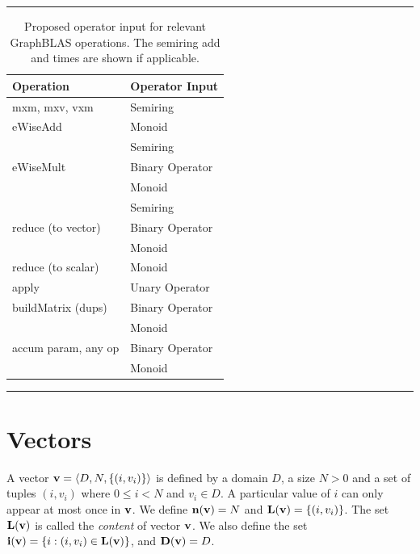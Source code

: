 \begin{table}
    \hrule
    \begin{center}
        \caption{Proposed operator input for relevant GraphBLAS operations. 
        The semiring add and times are shown if applicable.}
        \label{Tab:OperatorInputType}
        \begin{tabular}{l|l}
        Operation           & Operator Input  \\ \hline
        {\sf mxm, mxv, vxm} & Semiring \\ \hline
        {\sf eWiseAdd}    & Monoid           \\
                            & Semiring          \\ \hline
        {\sf eWiseMult}     & Binary Operator   \\
                            & Monoid          \\
                            & Semiring         \\ \hline
  {\sf reduce} (to vector)  & Binary Operator   \\
                            & Monoid           \\ \hline
  {\sf reduce} (to scalar)  & Monoid           \\ \hline
        {\sf apply}         & Unary Operator   \\ \hline
  {\sf buildMatrix} (dups)  & Binary Operator   \\
                            & Monoid           \\ \hline
{\sf accum} param, any op   & Binary Operator  \\
                            & Monoid            \\ 
        \end{tabular}
    \end{center}
    \hrule
\end{table}

\section{Vectors}
\label{Sec:Vectors}

A vector ${\bf v} = \langle D, N, \{ (i,v_i) \} \rangle$ is defined
by a domain $D$, a size $N>0$ and a set of tuples $(i,v_i)$ where
$0 \leq i < N$ and $v_i \in D$. A particular value of $i$ can only
appear at most once in ${\bf v}$. We define $\bold{n}({\bf v}) =
N$ and $\bold{L}({\bf v}) = \{ (i,v_i) \}$. The set $\bold{L}({\bf v})$ is called
the \emph{content} of vector ${\bf v}$. We also define the set
${\bf i({\bf v})} = \{ i : (i,v_i) \in \bold{L}({\bf v}) \}$,
and $\bold{D}({\bf v}) = D$.

